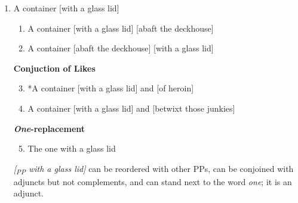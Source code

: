 \documentclass[12pt,letterpaper]{article}
\newcommand{\qtl}[1]{\strut #1}
\newcommand{\ppb}[1]{\emph{[\textsubscript{PP} #1]}}
\begin{document}
\begin{enumerate}[label=\alph*)]
	\item A container [with a glass lid]
	\par\vspace*{0.5ex}
	\begin{minipage}[c]{0.65\textwidth}
		\par\vspace{0.5ex}{\small\bfseries Reordering}
		\begin{enumerate}[label=(\arabic*),nosep]
			\item A container [with a glass lid] [abaft the deckhouse]
			\item A container [abaft the deckhouse] [with a glass lid]
		\end{enumerate}
		{\small\bfseries Conjuction of Likes}
		\begin{enumerate}[label=(\arabic*),nosep]
			\setcounter{enumii}{2}
			\item *A container [with a glass lid] and [of heroin]
			\item A container [with a glass lid] and [betwixt those junkies]
		\end{enumerate}
		{\small\bfseries \emph{One}-replacement}
		\begin{enumerate}[label=(\arabic*),nosep]
			\setcounter{enumii}{4}
			\item The one with a glass lid
		\end{enumerate}
	\end{minipage}\hfill\begin{minipage}[c]{0.25\textwidth}
		\hfill{}
	\end{minipage}

	\par\vspace*{2ex}
	\ppb{with a glass lid} can be reordered with other PPs, can be conjoined with adjuncts but
	not complements, and can stand next to the word \emph{one}; it is an adjunct.
	\par\vspace*{2ex}


\end{enumerate}
\end{document}
